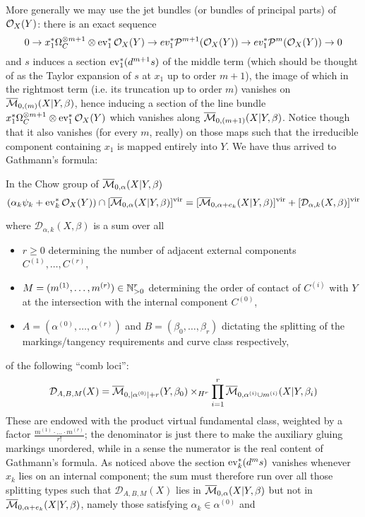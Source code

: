 More generally we may use the jet bundles (or bundles of principal parts) of $\mathcal{O}_X(Y)$: there is an exact sequence
\[ 0\rightarrow x_1^*\Omega_{C}^{\otimes m+1}\otimes\operatorname{ev}_1^*\mathcal{O}_X(Y)\rightarrow ev_1^*\mathcal P^{m+1}(\mathcal{O}_X(Y))\rightarrow ev_1^*\mathcal P^{m}(\mathcal{O}_X(Y))\rightarrow 0\]
and $s$ induces a section $\operatorname{ev}_1^*(d^{m+1}s)$ of the middle term (which should be thought of as the Taylor expansion of $s$ at $x_1$ up to order $m+1$), the image of which in the rightmost term (i.e. its truncation up to order $m$) vanishes on $\overline{\mathcal{M}}_{0,(m)}(X|Y,\beta)$, hence inducing a section of the line bundle $x_1^*\Omega_{C}^{\otimes m+1}\otimes\operatorname{ev}_1^*\mathcal{O}_X(Y)$ which vanishes along $\overline{\mathcal{M}}_{0,(m+1)}(X|Y,\beta)$. Notice though that it also vanishes (for every $m$, really) on those maps such that the irreducible component containing $x_1$ is mapped entirely into $Y$. We have thus arrived to Gathmann's formula:
\begin{thm}\cite[Theorem 2.6]{Ga}\label{thm:Gathmann_formula} In the Chow group of $\overline{\mathcal{M}}_{0,\alpha}(X|Y,\beta)$
 \begin{equation*} (\alpha_k \psi_k + \operatorname{ev}_k^* \mathcal{O}_X(Y)) \cap [\overline{\mathcal{M}}_{0,\alpha}(X|Y,\beta)]^{\mathrm{vir}} = [\overline{\mathcal{M}}_{0,\alpha+e_k}(X|Y,\beta)]^{\mathrm{vir}} + [\mathcal{D}_{\alpha,k}(X,\beta)]^{\mathrm{vir}} \end{equation*}
\end{thm}
where $\mathcal{D}_{\alpha,k}(X,\beta)$ is a sum over all
\begin{itemize}
 \item $r\geq 0$ determining the number of adjacent external components $C^{(1)},\ldots,C^{(r)}$,
 \item $M=(m^{(1)},\ldots,m^{(r)})\in \mathbb{N}^r_{>0}$ determining the order of contact of $C^{(i)}$ with $Y$ at the intersection with the internal component $C^{(0)}$,
 \item $A=(\alpha^{(0)},\ldots,\alpha^{(r)})$ and $B=(\beta_0,\ldots,\beta_r)$ dictating the splitting of the markings/tangency requirements and curve class respectively,
\end{itemize}
   of the following ``comb loci'':
\[\mathcal{D}_{A,B,M}(X)=\overline{\mathcal{M}}_{0,\lvert\alpha^{(0)}\rvert+r}(Y,\beta_0)\times_{H^r}\prod_{i=1}^r
\overline{\mathcal{M}}_{0,\alpha^{(i)}\cup m^{(i)}}(X|Y,\beta_i)\]
These are endowed with the product virtual fundamental class, weighted by a factor $\frac{m^{(1)}\cdot\ldots\cdot m^{(r)}}{r!}$; the denominator is just there to make the auxiliary gluing markings unordered, while in a sense the numerator is the real content of Gathmann's formula. As noticed above the section $\operatorname{ev}_k^*(d^ms)$ vanishes whenever $x_k$ lies on an internal component; the sum must therefore run over all those splitting types such that $\mathcal{D}_{A,B,M}(X)$ lies in $\overline{\mathcal{M}}_{0,\alpha}(X|Y,\beta)$ but not in $\overline{\mathcal{M}}_{0,\alpha+e_k}(X|Y,\beta)$, namely those satisfying $\alpha_k\in\alpha^{(0)}$ and
